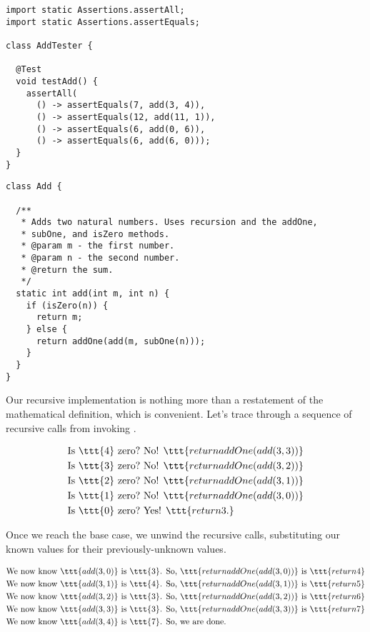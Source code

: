 \enlargethispage{-5\baselineskip}
\begin{lstlisting}[language=MyJava]
import static Assertions.assertAll;
import static Assertions.assertEquals;

class AddTester {
  
  @Test
  void testAdd() {
    assertAll(
      () -> assertEquals(7, add(3, 4)),
      () -> assertEquals(12, add(11, 1)),
      () -> assertEquals(6, add(0, 6)),
      () -> assertEquals(6, add(6, 0)));
  }
}
\end{lstlisting}

\begin{lstlisting}[language=MyJava]
class Add {

  /**
   * Adds two natural numbers. Uses recursion and the addOne, 
   * subOne, and isZero methods.
   * @param m - the first number.
   * @param n - the second number.
   * @return the sum.
   */
  static int add(int m, int n) {
    if (isZero(n)) { 
      return m;
    } else {
      return addOne(add(m, subOne(n)));
    }
  }
}
\end{lstlisting}

Our recursive implementation is nothing more than a restatement of the mathematical definition, which is convenient. 
Let's trace through a sequence of recursive calls from invoking .

\begin{align*}
    \text{Is }\ttt{4} \text{ zero?} &\text{ No! }\ttt{return addOne(add(3, 3))}\\
    \text{Is }\ttt{3} \text{ zero?} &\text{ No! }\ttt{return addOne(add(3, 2))}\\
    \text{Is }\ttt{2} \text{ zero?} &\text{ No! }\ttt{return addOne(add(3, 1))}\\
    \text{Is }\ttt{1} \text{ zero?} &\text{ No! }\ttt{return addOne(add(3, 0))}\\
    \text{Is }\ttt{0} \text{ zero?} &\text{ Yes! }\ttt{return 3.}
\end{align*}

Once we reach the base case, we unwind the recursive calls, substituting our known values for their previously-unknown values.

\begin{align*}
    \text{We now know }\ttt{add(3, 0)} \text{ is }\ttt{3}\text{. So, } &\ttt{return addOne(add(3, 0))} \text{ is } \ttt{return 4}\\
    \text{We now know }\ttt{add(3, 1)} \text{ is }\ttt{4}\text{. So, } &\ttt{return addOne(add(3, 1))} \text{ is } \ttt{return 5}\\
    \text{We now know }\ttt{add(3, 2)} \text{ is }\ttt{3}\text{. So, } &\ttt{return addOne(add(3, 2))} \text{ is } \ttt{return 6}\\
    \text{We now know }\ttt{add(3, 3)} \text{ is }\ttt{3}\text{. So, } &\ttt{return addOne(add(3, 3))} \text{ is } \ttt{return 7}\\
    \text{We now know }\ttt{add(3, 4)} \text{ is }\ttt{7}\text{. So, } &\text{we are done.} 
\end{align*}

